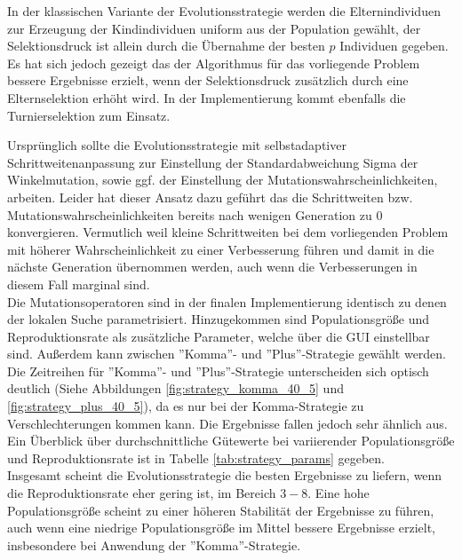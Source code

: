 \documentclass[twoside,bibtotoc]{report}
\begin{document}
In der klassischen Variante der Evolutionsstrategie werden die Elternindividuen zur Erzeugung der Kindindividuen uniform aus der Population gewählt, der Selektionsdruck ist allein durch die Übernahme der besten $p$ Individuen gegeben.
Es hat sich jedoch gezeigt das der Algorithmus für das vorliegende Problem bessere Ergebnisse erzielt, wenn der Selektionsdruck zusätzlich durch eine Elternselektion erhöht wird.
In der Implementierung kommt ebenfalls die Turnierselektion zum Einsatz.\\

\nsecend%


Ursprünglich sollte die Evolutionsstrategie mit selbstadaptiver Schrittweitenanpassung zur Einstellung der Standardabweichung Sigma der Winkelmutation, sowie ggf. der Einstellung der Mutationswahrscheinlichkeiten, arbeiten.
Leider hat dieser Ansatz dazu geführt das die Schrittweiten bzw. Mutationswahrscheinlichkeiten bereits nach wenigen Generation zu $0$ konvergieren.
Vermutlich weil kleine Schrittweiten bei dem vorliegenden Problem mit höherer Wahrscheinlichkeit zu einer Verbesserung führen und damit in die nächste Generation übernommen werden, auch wenn die Verbesserungen in diesem Fall marginal sind.\\

Die Mutationsoperatoren sind in der finalen Implementierung identisch zu denen der lokalen Suche parametrisiert.
Hinzugekommen sind Populationsgröße und Reproduktionsrate als zusätzliche Parameter, welche über die \gls{GUI} einstellbar sind.
Außerdem kann zwischen ''Komma''- und ''Plus''-Strategie gewählt werden.\\

Die Zeitreihen für ''Komma''- und ''Plus''-Strategie unterscheiden sich optisch deutlich (Siehe Abbildungen \ref{fig:strategy_komma_40_5} und \ref{fig:strategy_plus_40_5}), da es nur bei der Komma-Strategie zu Verschlechterungen kommen kann.
Die Ergebnisse fallen jedoch sehr ähnlich aus. Ein Überblick über durchschnittliche Gütewerte bei variierender Populationsgröße und Reproduktionsrate ist in Tabelle \ref{tab:strategy_params} gegeben.\\

Insgesamt scheint die Evolutionsstrategie die besten Ergebnisse zu liefern, wenn die Reproduktionsrate eher gering ist, im Bereich $3 - 8$.
Eine hohe Populationsgröße scheint zu einer höheren Stabilität der Ergebnisse zu führen, auch wenn eine niedrige Populationsgröße im Mittel bessere Ergebnisse erzielt, insbesondere bei Anwendung der ''Komma''-Strategie.
\end{document}
